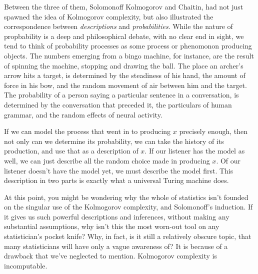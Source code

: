 Between the three of them, Solomonoff Kolmogorov and Chaitin, had not just spawned the idea of Kolmogorov complexity, but also illustrated the correspondence between \emph{descriptions} and \emph{probabilities}. While the nature of propbability is a deep and philosophical debate, with no clear end in sight, we tend to think of probability processes as some process or phenomonon producing objects. The numbers emerging from a bingo machine, for instance, are the result of spinning the machine, stopping and drawing the ball. The place an archer's arrow hits a target, is determined by the steadiness of his hand, the amount of force in his bow, and the random movement of air between him and the target. The probability of a person saying a particular sentence in a conversation, is determined by the conversation that preceded it, the particulars of human grammar, and the random effects of neural activity.

If we can model the process that went in to producing $x$ precisely enough, then not only can we determine its probability, we can take the history of its production, and use that as a description of $x$. If our listener has the model as well, we can just describe all the random choice made in producing $x$. Of our listener doesn't have the model yet, we must describe the model first. This description in two parts is exactly what a universal Turing machine does.

At this point, you might be wondering why the whole of statistics isn't founded on the singular use of the Kolmogorov complexity, and Solomonoff's induction. If it gives us such powerful descriptions and inferences, without making any substantial assumptions, why isn't this the most worn-out tool on any statistician's pocket knife? Why, in fact, is it still a relatively obscure topic, that many statisticians will have only a vague awareness of? It is because of a drawback that we've neglected to mention. Kolmogorov complexity is incomputable.     


